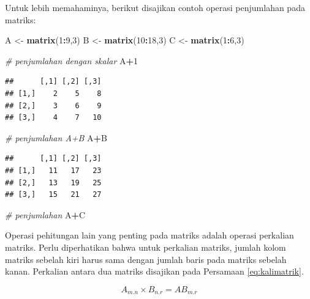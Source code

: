 \documentclass[]{book}
\newenvironment{Shaded}{\begin{snugshade}}{\end{snugshade}}
\newcommand{\CommentTok}[1]{\textcolor[rgb]{0.56,0.35,0.01}{\textit{#1}}}
\newcommand{\DecValTok}[1]{\textcolor[rgb]{0.00,0.00,0.81}{#1}}
\newcommand{\KeywordTok}[1]{\textcolor[rgb]{0.13,0.29,0.53}{\textbf{#1}}}
\newcommand{\NormalTok}[1]{#1}
\newcommand{\OperatorTok}[1]{\textcolor[rgb]{0.81,0.36,0.00}{\textbf{#1}}}
\newcommand{\StringTok}[1]{\textcolor[rgb]{0.31,0.60,0.02}{#1}}
\theoremstyle{definition}
\theoremstyle{definition}
\theoremstyle{definition}
\theoremstyle{remark}
\begin{document}
Untuk lebih memahaminya, berikut disajikan contoh operasi penjumlahan pada matriks:

\begin{Shaded}
\begin{Highlighting}[]
\NormalTok{A <-}\StringTok{ }\KeywordTok{matrix}\NormalTok{(}\DecValTok{1}\OperatorTok{:}\DecValTok{9}\NormalTok{,}\DecValTok{3}\NormalTok{)}
\NormalTok{B <-}\StringTok{ }\KeywordTok{matrix}\NormalTok{(}\DecValTok{10}\OperatorTok{:}\DecValTok{18}\NormalTok{,}\DecValTok{3}\NormalTok{)}
\NormalTok{C <-}\StringTok{ }\KeywordTok{matrix}\NormalTok{(}\DecValTok{1}\OperatorTok{:}\DecValTok{6}\NormalTok{,}\DecValTok{3}\NormalTok{)}

\CommentTok{# penjumlahan dengan skalar}
\NormalTok{A}\OperatorTok{+}\DecValTok{1}
\end{Highlighting}
\end{Shaded}

\begin{verbatim}
##      [,1] [,2] [,3]
## [1,]    2    5    8
## [2,]    3    6    9
## [3,]    4    7   10
\end{verbatim}

\begin{Shaded}
\begin{Highlighting}[]
\CommentTok{# penjumlahan A+B}
\NormalTok{A}\OperatorTok{+}\NormalTok{B}
\end{Highlighting}
\end{Shaded}

\begin{verbatim}
##      [,1] [,2] [,3]
## [1,]   11   17   23
## [2,]   13   19   25
## [3,]   15   21   27
\end{verbatim}

\begin{Shaded}
\begin{Highlighting}[]
\CommentTok{# penjumlahan}
\NormalTok{A}\OperatorTok{+}\NormalTok{C}
\end{Highlighting}
\end{Shaded}

Operasi pehitungan lain yang penting pada matriks adalah operasi perkalian matriks. Perlu diperhatikan bahwa untuk perkalian matriks, jumlah kolom matriks sebelah kiri harus sama dengan jumlah baris pada matriks sebelah kanan. Perkalian antara dua matriks disajikan pada Persamaan \eqref{eq:kalimatrik}.

\begin{equation}
A_{m.n}\times B_{n.r}=AB_{m.r}
  \label{eq:kalimatrik}
\end{equation}
\end{document}
